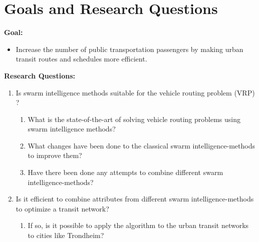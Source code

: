 \section{Goals and Research Questions}
\textbf{Goal:}
\begin{itemize}
\item Increase the number of public transportation passengers by making urban transit routes and schedules more efficient.
\end{itemize}
\textbf{Research Questions:}
\begin{enumerate}
  \item Is swarm intelligence methods suitable for the vehicle routing problem (VRP) ?
    \begin{enumerate}
    \item What is the state-of-the-art of solving vehicle routing problems using swarm intelligence methods?
    \item What changes have been done to the classical swarm intelligence-methods to improve them?
    \item Have there been done any attempts to combine different swarm intelligence-methods?
  \end{enumerate}
  
\item Is it efficient to combine attributes from different swarm intelligence-methods to optimize a transit network?
    \begin{enumerate}
    \item If so, is it possible to apply the algorithm to the urban transit networks to cities like Trondheim?
  \end{enumerate}
\end{enumerate}